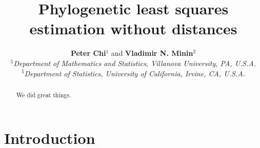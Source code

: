 \documentclass[a4paper, 12pt]{article}
\begin{document}

\title{\large{\textbf{Phylogenetic least squares estimation without distances}}}

\author{\small{\textbf{Peter Chi}$^{1}$ and \textbf{Vladimir N. Minin}$^{2}$}\\
\footnotesize{$^{5}$\emph{Department of Mathematics and Statistics, Villanova University, PA, U.S.A.}}\\
\footnotesize{$^{5}$\emph{Department of Statistics, University of California, Irvine, CA, U.S.A.}}\\
}

\date{}

\maketitle



%

\label{firstpage}

\begin{abstract}
We did great things.
\end{abstract}



\section{Introduction}
\end{document}
